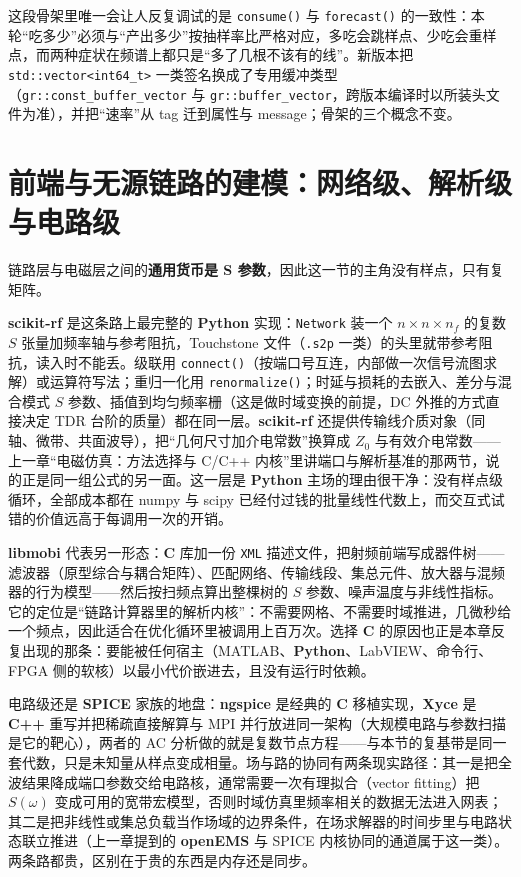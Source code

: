 \documentclass[12pt,a4paper,fontset=fandol]{ctexbook}
\newcommand{\Fn}[1]{\texttt{#1()}}
\newcommand{\Tp}[1]{\texttt{#1}}
\newcommand{\Bk}{\allowbreak}
\newcommand{\Lib}[1]{\textbf{#1}}
\newcommand{\Lang}[1]{\textsf{\bfseries #1}}
\newcommand{\CL}{\Lang{C}}
\newcommand{\CPP}{\Lang{C++}}
\newcommand{\PY}{\Lang{Python}}
\begin{document}
这段骨架里唯一会让人反复调试的是 \Fn{consume} 与 \Fn{forecast} 的一致性：本轮``吃多少''必须与``产出多少''按抽样率比严格对应，多吃会跳样点、少吃会重样点，而两种症状在频谱上都只是``多了几根不该有的线''。新版本把 \Tp{std::vector<int64\_t>} 一类签名换成了专用缓冲类型（\Tp{gr::const\Bk\_buffer\_vector} 与 \Tp{gr::buffer\Bk\_vector}，跨版本编译时以所装头文件为准），并把``速率''从 tag 迁到属性与 message；骨架的三个概念不变。

\section{前端与无源链路的建模：网络级、解析级与电路级}

链路层与电磁层之间的\textbf{通用货币是 S 参数}，因此这一节的主角没有样点，只有复矩阵。

\Lib{scikit-rf} 是这条路上最完整的 \PY{} 实现：\Tp{Network} \Bk{} 装一个 $n \times n \times n_f$ 的复数 $S$ 张量加频率轴与参考阻抗，Touchstone 文件（\Tp{.s2p} 一类）的头里就带参考阻抗，读入时不能丢。级联用 \Fn{connect}（按端口号互连，内部做一次信号流图求解）或运算符写法；重归一化用 \Fn{renormalize}；时延与损耗的去嵌入、差分与混合模式 $S$ 参数、插值到均匀频率栅（这是做时域变换的前提，DC 外推的方式直接决定 TDR 台阶的质量）都在同一层。\Lib{scikit-rf} 还提供传输线介质对象（同轴、微带、共面波导），把``几何尺寸加介电常数''换算成 $Z_0$ 与有效介电常数——上一章``电磁仿真：方法选择与 C/C++ 内核''里讲端口与解析基准的那两节，说的正是同一组公式的另一面。这一层是 \PY{} 主场的理由很干净：没有样点级循环，全部成本都在 numpy 与 scipy 已经付过钱的批量线性代数上，而交互式试错的价值远高于每调用一次的开销。

\Lib{libmobi} 代表另一形态：\CL{} 库加一份 \Tp{XML} 描述文件，把射频前端写成器件树——滤波器（原型综合与耦合矩阵）、匹配网络、传输线段、集总元件、放大器与混频器的行为模型——然后按扫频点算出整棵树的 $S$ 参数、噪声温度与非线性指标。它的定位是``链路计算器里的解析内核''：不需要网格、不需要时域推进，几微秒给一个频点，因此适合在优化循环里被调用上百万次。选择 \CL{} 的原因也正是本章反复出现的那条：要能被任何宿主（MATLAB、\PY{}、LabVIEW、命令行、FPGA 侧的软核）以最小代价嵌进去，且没有运行时依赖。

电路级还是 \Lib{SPICE} 家族的地盘：\Lib{ngspice} 是经典的 \CL{} 移植实现，\Lib{Xyce} 是 \CPP{} 重写并把稀疏直接解算与 MPI 并行放进同一架构（大规模电路与参数扫描是它的靶心），两者的 AC 分析做的就是复数节点方程——与本节的复基带是同一套代数，只是未知量从样点变成相量。场与路的协同有两条现实路径：其一是把全波结果降成端口参数交给电路核，通常需要一次有理拟合（vector fitting）把 $S(\omega)$ 变成可用的宽带宏模型，否则时域仿真里频率相关的数据无法进入网表；其二是把非线性或集总负载当作场域的边界条件，在场求解器的时间步里与电路状态联立推进（上一章提到的 \Lib{openEMS} 与 SPICE 内核协同的通道属于这一类）。两条路都贵，区别在于贵的东西是内存还是同步。
\end{document}
